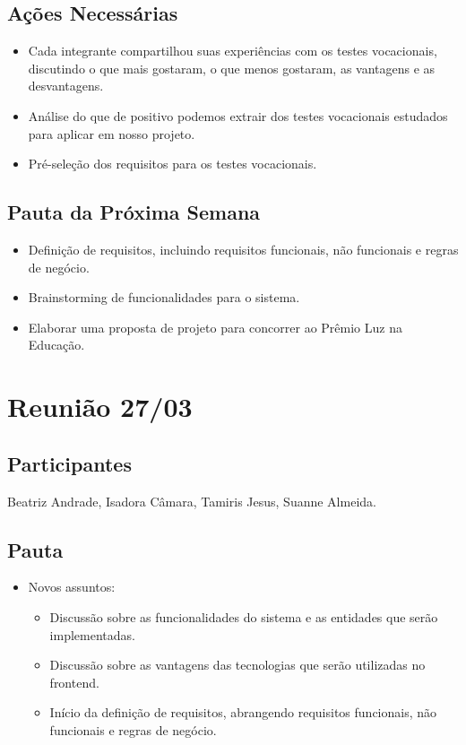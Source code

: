 \begin{apendicesenv}
\subsection*{Ações Necessárias}
\begin{itemize}
    \item Cada integrante compartilhou suas experiências com os testes vocacionais, discutindo o que mais gostaram, o que menos gostaram, as vantagens e as desvantagens.
    \item Análise do que de positivo podemos extrair dos testes vocacionais estudados para aplicar em nosso projeto.
    \item Pré-seleção dos requisitos para os testes vocacionais.
\end{itemize}

\subsection*{Pauta da Próxima Semana}
\begin{itemize}
    \item Definição de requisitos, incluindo requisitos funcionais, não funcionais e regras de negócio.
    \item Brainstorming de funcionalidades para o sistema.
    \item Elaborar uma proposta de projeto para concorrer ao Prêmio Luz na Educação.
\end{itemize}

\section*{Reunião 27/03}

\subsection*{Participantes}
Beatriz Andrade, Isadora Câmara, Tamiris Jesus, Suanne Almeida.

\subsection*{Pauta}
\begin{itemize}
    \item Novos assuntos:
    \begin{itemize}
        \item Discussão sobre as funcionalidades do sistema e as entidades que serão implementadas.
        \item Discussão sobre as vantagens das tecnologias que serão utilizadas no frontend.
        \item Início da definição de requisitos, abrangendo requisitos funcionais, não funcionais e regras de negócio.
    \end{itemize}
\end{itemize}


\end{apendicesenv}
